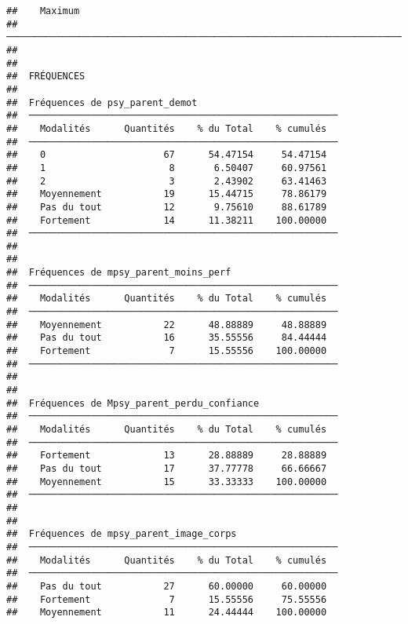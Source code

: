 \documentclass[
]{article}
\begin{document}
\begin{verbatim}
##    Maximum                                                                                                                                                                                                                                                       
##  ─────────────────────────────────────────────────────────────────────────────────────────────────────────────────────────────────────────────────────────────────────────────────────────────────────────────────────────────────────────────────────────────── 
## 
## 
##  FRÉQUENCES
## 
##  Fréquences de psy_parent_demot                          
##  ─────────────────────────────────────────────────────── 
##    Modalités      Quantités    % du Total    % cumulés   
##  ─────────────────────────────────────────────────────── 
##    0                     67      54.47154     54.47154   
##    1                      8       6.50407     60.97561   
##    2                      3       2.43902     63.41463   
##    Moyennement           19      15.44715     78.86179   
##    Pas du tout           12       9.75610     88.61789   
##    Fortement             14      11.38211    100.00000   
##  ─────────────────────────────────────────────────────── 
## 
## 
##  Fréquences de mpsy_parent_moins_perf                    
##  ─────────────────────────────────────────────────────── 
##    Modalités      Quantités    % du Total    % cumulés   
##  ─────────────────────────────────────────────────────── 
##    Moyennement           22      48.88889     48.88889   
##    Pas du tout           16      35.55556     84.44444   
##    Fortement              7      15.55556    100.00000   
##  ─────────────────────────────────────────────────────── 
## 
## 
##  Fréquences de Mpsy_parent_perdu_confiance               
##  ─────────────────────────────────────────────────────── 
##    Modalités      Quantités    % du Total    % cumulés   
##  ─────────────────────────────────────────────────────── 
##    Fortement             13      28.88889     28.88889   
##    Pas du tout           17      37.77778     66.66667   
##    Moyennement           15      33.33333    100.00000   
##  ─────────────────────────────────────────────────────── 
## 
## 
##  Fréquences de mpsy_parent_image_corps                   
##  ─────────────────────────────────────────────────────── 
##    Modalités      Quantités    % du Total    % cumulés   
##  ─────────────────────────────────────────────────────── 
##    Pas du tout           27      60.00000     60.00000   
##    Fortement              7      15.55556     75.55556   
##    Moyennement           11      24.44444    100.00000   

\end{verbatim}
\end{document}
